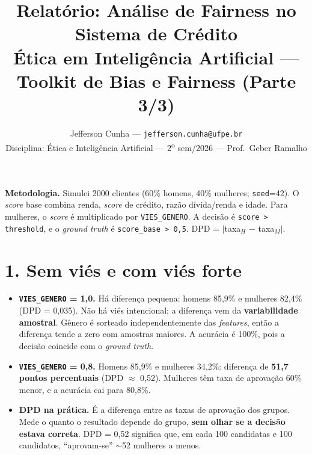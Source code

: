 \documentclass[10pt,a4paper]{article}
\title{\vspace{-1.4cm}\textbf{Relat\'orio: An\'alise de Fairness no Sistema de Cr\'edito}\\[2pt]
\normalsize \'Etica em Intelig\^encia Artificial --- Toolkit de Bias e Fairness (Parte 3/3)\vspace{-0.4cm}}
\author{\small Jefferson Cunha --- \texttt{jefferson.cunha@ufpe.br}\\[1pt]
\small Disciplina: \'Etica e Intelig\^encia Artificial --- 2\textsuperscript{o} sem/2026 --- Prof.\ Geber Ramalho}
\date{\vspace{-0.6cm}}
\begin{document}
\maketitle

\textbf{Metodologia.} Simulei 2000 clientes (60\% homens, 40\% mulheres; \texttt{seed}=42). O \textit{score} base combina renda, \textit{score} de cr\'edito, raz\~ao d\'ivida/renda e idade. Para mulheres, o \textit{score} \'e multiplicado por \texttt{VIES\_GENERO}. A decis\~ao \'e \texttt{score > threshold}, e o \textit{ground truth} \'e \texttt{score\_base > 0,5}. DPD = $|$taxa$_H$ $-$ taxa$_M|$.

\section*{1. Sem vi\'es e com vi\'es forte}
\begin{itemize}
  \item \textbf{\texttt{VIES\_GENERO} = 1,0.} H\'a diferen\c{c}a pequena: homens 85,9\% e mulheres 82,4\% (DPD = 0,035). N\~ao h\'a vi\'es intencional; a diferen\c{c}a vem da \textbf{variabilidade amostral}. G\^enero \'e sorteado independentemente das \textit{features}, ent\~ao a diferen\c{c}a tende a zero com amostras maiores. A acur\'acia \'e 100\%, pois a decis\~ao coincide com o \textit{ground truth}.
  \item \textbf{\texttt{VIES\_GENERO} = 0,8.} Homens 85,9\% e mulheres 34,2\%: diferen\c{c}a de \textbf{51,7 pontos percentuais} (DPD $\approx$ 0,52). Mulheres t\^em taxa de aprova\c{c}\~ao 60\% menor, e a acur\'acia cai para 80,8\%.
  \item \textbf{DPD na pr\'atica.} \'E a diferen\c{c}a entre as taxas de aprova\c{c}\~ao dos grupos. Mede o quanto o resultado depende do grupo, \textbf{sem olhar se a decis\~ao estava correta}. DPD = 0,52 significa que, em cada 100 candidatas e 100 candidatos, ``aprovam-se'' $\sim$52 mulheres a menos.
\end{itemize}
\end{document}

